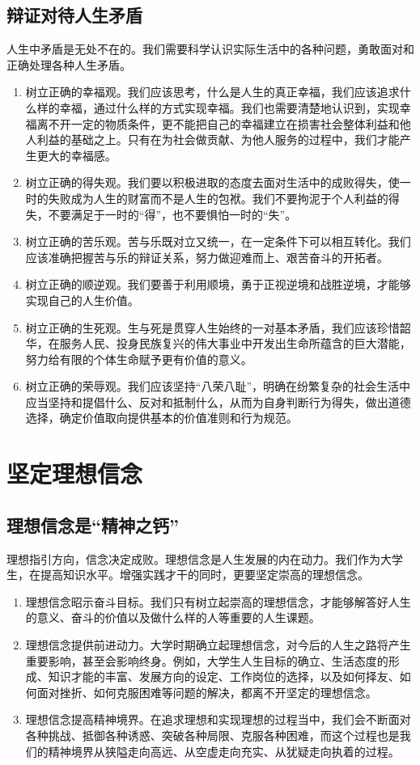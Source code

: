 \subsection{辩证对待人生矛盾}
人生中矛盾是无处不在的。我们需要科学认识实际生活中的各种问题，勇敢面对和正确处理各种人生矛盾。
\begin{enumerate}
\item 树立正确的幸福观。我们应该思考，什么是人生的真正幸福，我们应该追求什么样的幸福，通过什么样的方式实现幸福。我们也需要清楚地认识到，实现幸福离不开一定的物质条件，更不能把自己的幸福建立在损害社会整体利益和他人利益的基础之上。只有在为社会做贡献、为他人服务的过程中，我们才能产生更大的幸福感。
\item 树立正确的得失观。我们要以积极进取的态度去面对生活中的成败得失，使一时的失败成为人生的财富而不是人生的包袱。我们不要拘泥于个人利益的得失，不要满足于一时的“得”，也不要惧怕一时的“失”。
\item 树立正确的苦乐观。苦与乐既对立又统一，在一定条件下可以相互转化。我们应该准确把握苦与乐的辩证关系，努力做迎难而上、艰苦奋斗的开拓者。
\item 树立正确的顺逆观。我们要善于利用顺境，勇于正视逆境和战胜逆境，才能够实现自己的人生价值。
\item 树立正确的生死观。生与死是贯穿人生始终的一对基本矛盾，我们应该珍惜韶华，在服务人民、投身民族复兴的伟大事业中开发出生命所蕴含的巨大潜能，努力给有限的个体生命赋予更有价值的意义。
\item 树立正确的荣辱观。我们应该坚持“八荣八耻”，明确在纷繁复杂的社会生活中应当坚持和提倡什么、反对和抵制什么，从而为自身判断行为得失，做出道德选择，确定价值取向提供基本的价值准则和行为规范。
\end{enumerate}

\section{坚定理想信念}

\subsection{理想信念是“精神之钙”}
理想指引方向，信念决定成败。理想信念是人生发展的内在动力。我们作为大学生，在提高知识水平。增强实践才干的同时，更要坚定崇高的理想信念。
\begin{enumerate}
\item 理想信念昭示奋斗目标。我们只有树立起崇高的理想信念，才能够解答好人生的意义、奋斗的价值以及做什么样的人等重要的人生课题。
\item 理想信念提供前进动力。大学时期确立起理想信念，对今后的人生之路将产生重要影响，甚至会影响终身。例如，大学生人生目标的确立、生活态度的形成、知识才能的丰富、发展方向的设定、工作岗位的选择，以及如何择友、如何面对挫折、如何克服困难等问题的解决，都离不开坚定的理想信念。
\item 理想信念提高精神境界。在追求理想和实现理想的过程当中，我们会不断面对各种挑战、抵御各种诱惑、突破各种局限、克服各种困难，而这个过程也是我们的精神境界从狭隘走向高远、从空虚走向充实、从犹疑走向执着的过程。
\end{enumerate}

